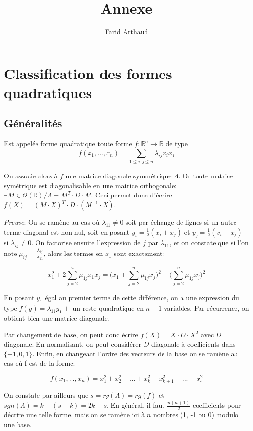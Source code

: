 \documentclass[a4paper]{article}
\begin{document}
\title{Annexe}
\author{Farid Arthaud}
\maketitle
\tableofcontents

\section{Classification des formes quadratiques}

\subsection{Généralités}

Est appelée forme quadratique toute forme $f:\mathbb{R}^n\to\mathbb{R}$ de type $$f(x_1,...,x_n)=\sum_{1\leq i,j\leq n}\lambda_{ij}x_ix_j$$

On associe alors à $f$ une matrice diagonale symmétrique $\Lambda$. Or toute matrice symétrique est diagonalisable en une matrice orthogonale: $\exists M \in \mathcal{O}(\mathbb{R}) / \Lambda = M^T\cdot D\cdot M$. Ceci permet donc d'écrire $f(X) = (M\cdot X)^T\cdot D\cdot (M^{-1}\cdot X)$.

\textit{Preuve}: On se ramène au cas où $\lambda_{11} \neq 0$ soit par échange de lignes si un autre terme diagonal est non nul, soit en posant $y_i=\frac{1}{2}(x_i+x_j)$ et $y_j=\frac{1}{2}(x_i-x_j)$ si $\lambda_{ij}\neq 0$. On factorise ensuite l'expression de $f$ par $\lambda_{11}$, et on constate que si l'on note $\mu_{ij}=\frac{\lambda_{ij}}{\lambda_{11}}$, alors les termes en $x_1$ sont exactement:

$$x_1^2+2\sum_{j=2}^n \mu_{1j}x_1x_j=\big(x_1+\sum_{j=2}^n \mu_{1j}x_j\big)^2-\big(\sum_{j=2}^n \mu_{1j}x_j\big)^2$$

En posant $y_1$ égal au premier terme de cette différence, on a une expression du type $f(y)=\lambda_{11}y_1+$ un reste quadratique en $n-1$ variables. Par récurrence, on obtient bien une matrice diagonale.

Par changement de base, on peut donc écrire $f(X) = X\cdot D\cdot X^T$ avec $D$ diagonale. En normalisant, on peut considérer $D$ diagonale à coefficients dans $\{-1,0,1\}$. Enfin, en changeant l'ordre des vecteurs de la base on se ramène au cas où f est de la forme:

$$f(x_1,...,x_n)=x_1^2+x_2^2+...+x_k^2-x_{k+1}^2-...-x_s^2$$

On constate par ailleurs que $s=rg(\Lambda)=rg(f)$ et $sgn(\Lambda)=k-(s-k)=2k-s$. En général, il faut $\frac{n(n+1)}{2}$ coefficients pour décrire une telle forme, mais on se ramène ici à $n$ nombres (1, -1 ou 0) modulo une base.
\end{document}
